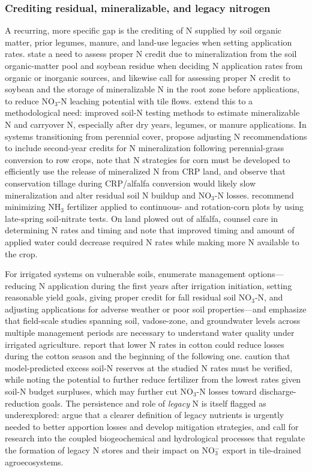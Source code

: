 \documentclass[11pt]{article}
\begin{document}
\subsubsection{Crediting residual, mineralizable, and legacy nitrogen}
A recurring, more specific gap is the crediting of N supplied by soil organic matter, prior legumes, manure, and land-use legacies when setting application rates. \textcite{Bakhsh2007} state a need to assess proper N credit due to mineralization from the soil organic-matter pool and soybean residue when deciding N application rates from organic or inorganic sources, and \textcite{Bakhsh2005} likewise call for assessing proper N credit to soybean and the storage of mineralizable N in the root zone before applications, to reduce NO$_3$-N leaching potential with tile flows. \textcite{Randall2001} extend this to a methodological need: improved soil-N testing methods to estimate mineralizable N and carryover N, especially after dry years, legumes, or manure applications. In systems transitioning from perennial cover, \textcite{Huggins2001} propose adjusting N recommendations to include second-year credits for N mineralization following perennial-grass conversion to row crops, note that N strategies for corn must be developed to efficiently use the release of mineralized N from CRP land, and observe that conservation tillage during CRP/alfalfa conversion would likely slow mineralization and alter residual soil N buildup and NO$_3$-N losses. \textcite{Weed1996} recommend minimizing NH$_3$ fertilizer applied to continuous- and rotation-corn plots by using late-spring soil-nitrate tests. On land plowed out of alfalfa, \textcite{ROBBINS1980} counsel care in determining N rates and timing and note that improved timing and amount of applied water could decrease required N rates while making more N available to the crop.

For irrigated systems on vulnerable soils, \textcite{Derby2009} enumerate management options---reducing N application during the first years after irrigation initiation, setting reasonable yield goals, giving proper credit for fall residual soil NO$_3$-N, and adjusting applications for adverse weather or poor soil properties---and emphasize that field-scale studies spanning soil, vadose-zone, and groundwater levels across multiple management periods are necessary to understand water quality under irrigated agriculture. \textcite{Hurtado2011} report that lower N rates in cotton could reduce losses during the cotton season and the beginning of the following one. \textcite{Ale2012b} caution that model-predicted excess soil-N reserves at the studied N rates must be verified, while noting the potential to further reduce fertilizer from the lowest rates given soil-N budget surpluses, which may further cut NO$_3$-N losses toward discharge-reduction goals. The persistence and role of \emph{legacy} N is itself flagged as underexplored: \textcite{Williams2022} argue that a clearer definition of legacy nutrients is urgently needed to better apportion losses and develop mitigation strategies, and \textcite{Hu2024} call for research into the coupled biogeochemical and hydrological processes that regulate the formation of legacy N stores and their impact on NO$_3^-$ export in tile-drained agroecosystems.
\end{document}
